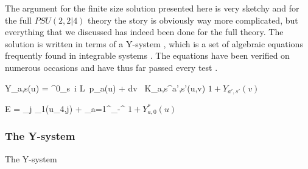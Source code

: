 The argument for the finite size solution presented here is very sketchy and for the full $PSU(2,2|4)$ theory the story is obviously way more complicated, but everything that we discussed has indeed been done for the full theory. The solution is written in terms of a Y-system \cite{gromov_tba}, which is a set of algebraic equations frequently found in integrable systems \cite{gromov_hirota}. The  equations have been verified on numerous occasions and have thus far passed every test \cite{gromov_tests}.

\beq
	\log Y_{a,s}(u) = \delta^0_s\, i L\, p_a(u) + \int dv \, K_{a,s}^{a',s'}(u,v) \log \( 1+Y_{a',s'}(v) \)
\eeq

\beq
	E = \sum_j \epsilon_1(u_{4,j}) + \sum_{a=1}^\infty \int_{-\infty}^\infty {}  \log \(1 + Y_{a,0}^* (u) \)
\eeq

\subsubsection{The Y-system}



The Y-system

